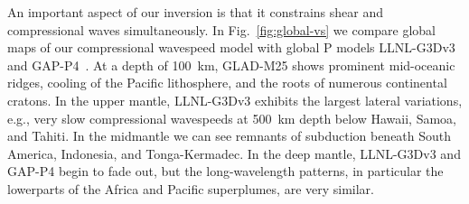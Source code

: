 
An important aspect of our inversion is that it constrains shear and
compressional waves simultaneously. In Fig.~\ref{fig:global-vs} we
compare global maps of our compressional wavespeed model with global P models
LLNL-G3Dv3~\cite{simmons2012llnl} and GAP-P4~\cite{fukao2013subducted}.
At a depth of 100~km,
GLAD-M25 shows prominent mid-oceanic ridges, cooling of the Pacific lithosphere,
and the roots of numerous continental cratons. In the upper mantle, LLNL-G3Dv3
exhibits the largest lateral variations,
e.g., very slow compressional wavespeeds at 500~km depth below Hawaii, Samoa, and Tahiti.
In the midmantle we can see remnants of subduction beneath South America, Indonesia,
and Tonga-Kermadec.
In the deep mantle, LLNL-G3Dv3 and GAP-P4 begin to fade out, but the long-wavelength patterns,
in particular the lowerparts of the Africa and Pacific superplumes, are very similar.

